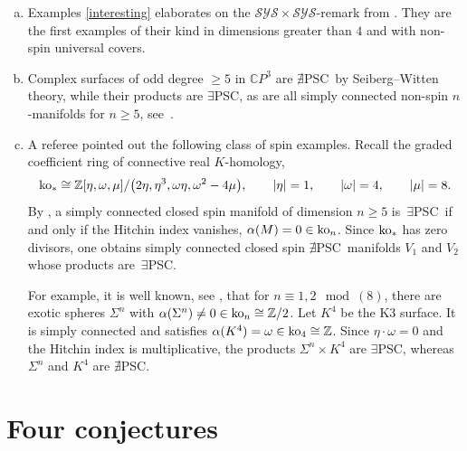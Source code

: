 \documentclass[10pt,a4paper]{amsart}
\numberwithin{equation}{section}
\newcommand{\Z}{\mathbb{Z}}
\newcommand{\no}{{\color{brown!70!black}$\nexists$}{\sf PSC}}
\newcommand{\yes}{{\color {blue!70!black}$\exists$}{\sf PSC}}
\begin{document}
\begin{Remark}\quad
\begin{enumerate}[(a)]\itemsep=0pt
\item Examples \ref{interesting} elaborates on the $\mathcal{SYS} \times \mathcal{SYS}$-remark from \cite{Gr2018}.
They are the first examples of their kind in dimensions greater than $4$ and with non-spin universal covers.
\item Complex surfaces of odd degree $\geq 5$ in $\mathbb{C}P^3$ are \no~by Seiberg--Witten theory, while their products are \yes, as are all simply connected non-spin $n$-manifolds for $n\geq 5$, see~\cite{GL}.
\item A referee pointed out the following class of spin examples.
Recall the graded coefficient ring of connective real $K$-homology,
\[
 {\rm ko}_* \cong \Z[ \eta, \omega, \mu] / \big( 2 \eta, \eta^3, \omega \eta, \omega^2 - 4 \mu\big), \qquad |\eta| = 1,\qquad |\omega| = 4,\qquad |\mu|=8.
\]
By \cite[Theorem A]{Stolz92}, a simply connected closed spin manifold of dimension $n \geq 5$ is~\yes~if and only if the Hitchin index \cite{Hitchin} vanishes, $\alpha(M) = 0 \in {\rm ko}_n$.
Since ${\rm ko}_*$ has zero divisors, one obtains simply connected closed spin \no~manifolds $V_1$ and $V_2$ whose products are~\yes.

For example, it is well known, see \cite[p.\ 44]{Hitchin}, that for $n \equiv 1, 2 \mod(8)$, there are exotic spheres $\Sigma^n$ with $\alpha(\Sigma^n) \neq 0 \in {\rm ko}_n \cong \Z/2$.
Let $K^4$ be the K3 surface.
It is simply connected and satisfies $\alpha(K^4) = \omega \in {\rm ko}_4 \cong \Z$.
Since $\eta \cdot \omega = 0$ and the Hitchin index is multiplicative, the products $\Sigma^n \times K^4$ are \yes, whereas $\Sigma^n$ and $K^4$ are \no.
\end{enumerate}
\end{Remark}

\section{Four conjectures} \label{fourconjectures}
\end{document}
